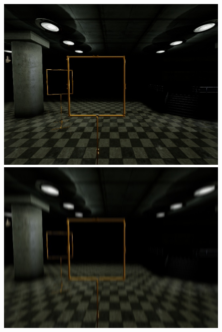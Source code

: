\begin{figure}[htbp]
	\begin{minipage}{0.33\textwidth}
		\includegraphics[width=\textwidth]{fig/gate_example}
	\end{minipage}
	\begin{minipage}{0.33\textwidth}
		\includegraphics[width=\textwidth]{fig/gate_example_motionblur_v}
	\end{minipage}
	\begin{minipage}{0.33\textwidth}

\end{minipage}
\end{figure}
